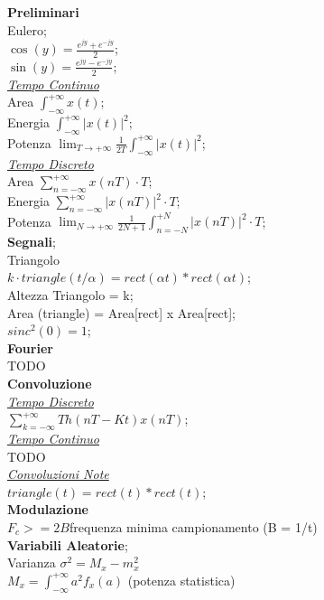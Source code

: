 \documentclass[a4paper]{article}
\begin{document}
\begin{multicols*}{3}
\textbf{Preliminari} \\
Eulero; \\
$\cos(y)=\frac{e^{jy} + e^{-jy}}{2}$; \\
$\sin(y)=\frac{e^{jy} - e^{-jy}}{2}$; \\
\underline{\textit{Tempo Continuo}} \\
Area $\int_{-\infty}^{+\infty} x(t)$; \\
Energia $\int_{-\infty}^{+\infty} |x(t)|^2$; \\
Potenza 
$\lim_{T \to +\infty}\frac{1}{2T}\int_{-\infty}^{+\infty}|x(t)|^2$; \\
\underline{\textit{Tempo Discreto}} \\
Area $\sum_{n=-\infty}^{+\infty} x(nT) \cdot T$; \\
Energia $\sum_{n=-\infty}^{+\infty}|x(nT)|^2\cdot T$; \\
Potenza
$\lim_{N \to +\infty}{\frac{1}{2N + 1}\int_{n=-N}^{+N}|x(nT)|^2\cdot T}$; \\
\textbf{Segnali}; \\
Triangolo \\
$k\cdot triangle(t/\alpha) = rect(\alpha t) * rect(\alpha t)$; \\
Altezza Triangolo = k; \\
Area (triangle) = Area[rect] x Area[rect]; \\ 
$sinc^2(0) = 1$;\\
\textbf{Fourier} \\
TODO \\
\textbf{Convoluzione} \\
\underline{\textit{Tempo Discreto}} \\
$\sum_{k=-\infty}^{+\infty}{Th(nT-Kt)x(nT)}$; \\
\underline{\textit{Tempo Continuo}} \\
TODO \\ 
\underline{\textit{Convoluzioni Note}} \\
$triangle(t) = rect(t) * rect(t)$; \\
\textbf{Modulazione} \\
$F_c>=2B$frequenza minima campionamento (B = 1/t)\\
\textbf{Variabili Aleatorie}; \\
Varianza $\sigma^2=M_x-m_x^2$ \\
$M_x=\int_{-\infty}^{+\infty} a^2 f_x(a)$ (potenza statistica)\\

\end{multicols*}
\end{document}
